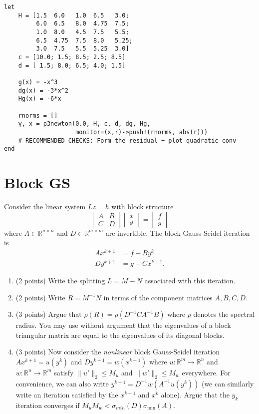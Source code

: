 \documentclass[12pt, leqno]{article} %
\providecommand{\tightlist}{%
  \setlength{\itemsep}{0pt}\setlength{\parskip}{0pt}}
\begin{document}
\begin{verbatim}
let
    H = [1.5  6.0   1.0  6.5   3.0;
         6.0  6.5   8.0  4.75  7.5;
         1.0  8.0   4.5  7.5   5.5;
         6.5  4.75  7.5  8.0   5.25;
         3.0  7.5   5.5  5.25  3.0]
    c = [10.0; 1.5; 8.5; 2.5; 8.5]
    d = [ 1.5; 8.0; 6.5; 4.0; 1.5]

    g(x) = -x^3
    dg(x) = -3*x^2
    Hg(x) = -6*x

    rnorms = []
    γ, x = p3newton(0.0, H, c, d, dg, Hg,
                    monitor=(x,r)->push!(rnorms, abs(r)))
    # RECOMMENDED CHECKS: Form the residual + plot quadratic conv
end
\end{verbatim}

\section{Block GS}

Consider the linear system \(Lz = h\) with block structure
\[\begin{bmatrix} A & B \\ C & D \end{bmatrix}
  \begin{bmatrix} x \\ y \end{bmatrix} =
  \begin{bmatrix} f \\ g \end{bmatrix}\] where
\(A \in \mathbb{R}^{n \times n}\) and \(D \in \mathbb{R}^{m \times m}\)
are invertible. The block Gauss-Seidel iteration is \begin{align*}
  Ax^{k+1} &= f - B y^k \\
  Dy^{k+1} &= g - C x^{k+1}.
\end{align*}

\begin{enumerate}
\def\labelenumi{\arabic{enumi}.}
\tightlist
\item
  (2 points) Write the splitting \(L = M-N\) associated with this
  iteration.
\item
  (2 points) Write \(R = M^{-1} N\) in terms of the component matrices
  \(A, B, C, D\).
\item
  (3 points) Argue that \(\rho(R) = \rho(D^{-1} C A^{-1} B)\) where
  \(\rho\) denotes the spectral radius. You may use without argument
  that the eigenvalues of a block triangular matrix are equal to the
  eigenvalues of its diagonal blocks.
\item
  (3 points) Now consider the \emph{nonlinear} block Gauss-Seidel
  iteration \(Ax^{k+1} = u(y^k)\) and \(D y^{k+1} = w(x^{k+1})\) where
  \(u : \mathbb{R}^m \rightarrow \mathbb{R}^n\) and
  \(w : \mathbb{R}^n \rightarrow \mathbb{R}^m\) satisfy
  \(\|u'\|_2 \leq M_u\) and \(\|w'\|_2 \leq M_w\) everywhere. For
  convenience, we can also write \(y^{k+1} = D^{-1} w(A^{-1} u(y^k))\)
  (we can similarly write an iteration satisfied by the \(x^{k+1}\) and
  \(x^k\) alone). Argue that the \(y_{k}\) iteration converges if
  \(M_u M_w < \sigma_{min}(D) \sigma_{\min}(A)\).
\end{enumerate}
\end{document}
